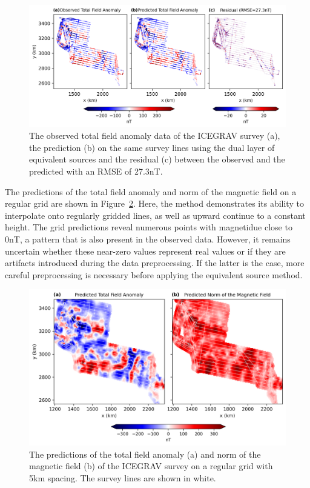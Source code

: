 \begin{figure}[!h]
\centering
\includegraphics[width=1\linewidth]{paper/figures/real_line_pred.png}
\caption{
    The observed total field anomaly data of the ICEGRAV survey \citep{ICEGRAV_data} (a), the prediction (b) on the same survey lines using the dual layer of equivalent sources and the residual (c) between the observed and the predicted with an RMSE of 27.3nT.
}
\label{fig:real_line_pred}
\end{figure}

The predictions of the total field anomaly and norm of the magnetic field on a regular grid are shown in Figure~\ref{fig:real_grid_pred}. Here, the method demonstrates its ability to interpolate onto regularly gridded lines, as well as upward continue to a constant height. The grid predictions reveal numerous points with magnetidue close to 0nT, a pattern that is also present in the observed data. However, it remains uncertain whether these near-zero values represent real values or if they are artifacts introduced during the data preprocessing. If the latter is the case, more careful preprocessing is necessary before applying the equivalent source method.

\begin{figure}[!h]
\centering
\includegraphics[width=1\linewidth]{paper/figures/real_grid_pred.png}
\caption{
    The predictions of the total field anomaly (a) and norm of the magnetic field (b) of the ICEGRAV survey \citep{ICEGRAV_data} on a regular grid with 5km spacing. The survey lines are shown in white.
}
\label{fig:real_grid_pred}
\end{figure}


